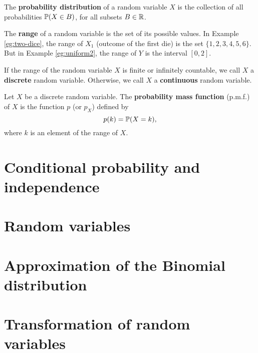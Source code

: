   \begin{definition}
    The \textbf{probability distribution} of a random variable $X$ is the
    collection of all probabilities $\mathbb{P}(X\in B)$, for all subsets $B\in \mathbb{R}$.
  \end{definition}
  The \textbf{range} of a random variable is the set of its possible values. In
  Example \ref{eg:two-dice}, the range of $X_1$ (outcome of the first die) is
  the set $\{1,2,3,4,5,6\}$. But in Example \ref{eg:uniform2}, the range of $Y$
  is the interval $[0,2]$.
  \begin{definition}
   If the range of the random variable $X$ is finite or infinitely countable, we
   call $X$ a \textbf{discrete} random variable. Otherwise, we call $X$ a
   \textbf{continuous} random variable.
  \end{definition}
  \begin{definition}
    Let $X$ be a discrete random variable. The \textbf{probability mass
      function} (p.m.f.) of $X$ is the function $p$ (or $p_X$) defined by
    \[
      p(k) = \mathbb{P}(X = k),
    \]
    where $k$ is an element of the range of $X$.
  \end{definition}
  

\section{Conditional probability and independence}
\label{sec:cond-prob-indep}


\section{Random variables}
\label{sec:random-variables}


\section{Approximation of the Binomial distribution}
\label{sec:appr-binom-distr}


\section{Transformation of random variables}
\label{sec:transf-rand-vari}

